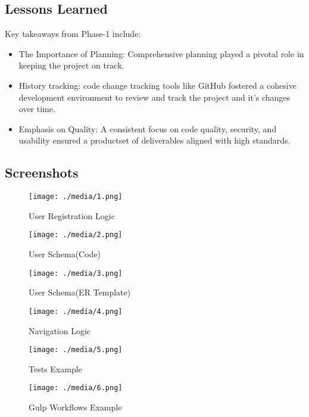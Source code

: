 \documentclass[11pt]{article}
\begin{document}
\subsection{Lessons Learned}
\label{sec:org65924c0}
Key takeaways from Phase-1 include:

\begin{itemize}
\item The Importance of Planning: Comprehensive planning played a pivotal role
in keeping the project on track.

\item History tracking: code change tracking tools like GitHub fostered a
cohesive development environment to review and track the project and it's
changes over time.

\item Emphasis on Quality: A consistent focus on code quality, security, and
usability ensured a productset of deliverables aligned with high
standards.
\end{itemize}


\subsection{Screenshots}
\label{sec:org1b3d88f}

\begin{figure}[htbp]
\centering
\texttt{[image: ./media/1.png]}
\caption{User Registration Logic}
\end{figure}

\begin{figure}[htbp]
\centering
\texttt{[image: ./media/2.png]}
\caption{User Schema(Code)}
\end{figure}

\begin{figure}[htbp]
\centering
\texttt{[image: ./media/3.png]}
\caption{User Schema(ER Template)}
\end{figure}

\begin{figure}[htbp]
\centering
\texttt{[image: ./media/4.png]}
\caption{Navigation Logic}
\end{figure}

\begin{figure}[htbp]
\centering
\texttt{[image: ./media/5.png]}
\caption{Tests Example}
\end{figure}

\begin{figure}[htbp]
\centering
\texttt{[image: ./media/6.png]}
\caption{Gulp Workflows Example}
\end{figure}
\end{document}

